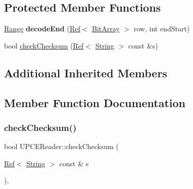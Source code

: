 \subsection*{Protected Member Functions}
\begin{DoxyCompactItemize}
\item 
\mbox{\label{classzxing_1_1oned_1_1_u_p_c_e_reader_a2ce12af3a8ea9b31723a6922715447fa}} 
\mbox{\hyperlink{structzxing_1_1oned_1_1_one_d_reader_1_1_range}{Range}} {\bfseries decode\+End} (\mbox{\hyperlink{classzxing_1_1_ref}{Ref}}$<$ \mbox{\hyperlink{classzxing_1_1_bit_array}{Bit\+Array}} $>$ row, int end\+Start)
\item 
bool \mbox{\hyperlink{classzxing_1_1oned_1_1_u_p_c_e_reader_abb30f05f10f7f87ab247780eafd5b50a}{check\+Checksum}} (\mbox{\hyperlink{classzxing_1_1_ref}{Ref}}$<$ \mbox{\hyperlink{classzxing_1_1_string}{String}} $>$ const \&s)
\end{DoxyCompactItemize}
\subsection*{Additional Inherited Members}


\subsection{Member Function Documentation}
\mbox{\label{classzxing_1_1oned_1_1_u_p_c_e_reader_abb30f05f10f7f87ab247780eafd5b50a}} 
\subsubsection{\texorpdfstring{check\+Checksum()}{checkChecksum()}}
{\footnotesize\ttfamily bool U\+P\+C\+E\+Reader\+::check\+Checksum (\begin{DoxyParamCaption}\item[{\mbox{\hyperlink{classzxing_1_1_ref}{Ref}}$<$ \mbox{\hyperlink{classzxing_1_1_string}{String}} $>$ const \&}]{s }\end{DoxyParamCaption})\hspace{0.3cm}{\ttfamily [protected]}, {\ttfamily [virtual]}}

